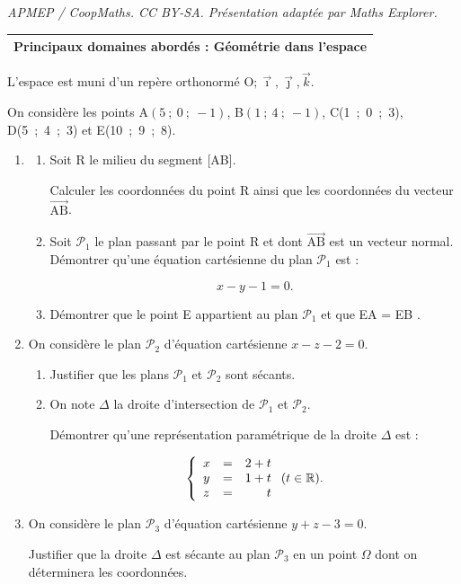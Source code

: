 \documentclass[10pt]{article}
\providecommand{\R}{\mathbb{R}}
\providecommand{\vect}[1]{\overrightarrow{#1}}
\providecommand{\Oijk}{\(\mathrm{O};\vec{\imath},\vec{\jmath},\vec{k}\)}
\begin{document}
\noindent\textit{APMEP / CoopMaths. CC BY-SA. Présentation adaptée par Maths Explorer.}\par\medskip
\medskip

\begin{tabularx}{\linewidth}{|X|}\hline
\textbf{Principaux domaines abordés :} Géométrie dans l'espace\\ \hline
\end{tabularx}

\medskip

L'espace est muni d'un repère orthonormé \Oijk.

On considère les points A$(5~;~0~;~-1)$, B$(1~;~4~;~-1)$, C(1~;~0~;~3), D(5~;~4~;~3) et E(10~;~9~;~8).

\medskip

\begin{enumerate}
\item 
	\begin{enumerate}
		\item Soit R le milieu du segment [AB].
		
Calculer les coordonnées du point R ainsi que les coordonnées du vecteur $\vect{\text{AB}}$.
		\item Soit $\mathcal{P}_1$ le plan passant par le point R et dont $\vect{\text{AB}}$ est un vecteur normal. Démontrer qu'une équation cartésienne du plan $\mathcal{P}_1$ est :

\[x - y - 1 = 0.\]

		\item Démontrer que le point E appartient au plan $\mathcal{P}_1$ et que EA = EB .
	\end{enumerate}	
\item  On considère le plan $\mathcal{P}_2$ d'équation cartésienne $x - z - 2 = 0$. 
	\begin{enumerate}
		\item Justifier que les plans $\mathcal{P}_1$ et $\mathcal{P}_2$ sont sécants.
		\item On note $\Delta$ la droite d'intersection de $\mathcal{P}_1$ et $\mathcal{P}_2$.
		
Démontrer qu'une représentation paramétrique de la droite $\Delta$ est :

\[\left\{\begin{array}{l c r}
x&=&2+t\\
y&=&1+t \\
z&=&t\end{array}\right.(t \in \R).\]

	\end{enumerate}
\item  On considère le plan $\mathcal{P}_3$ d'équation cartésienne $y + z - 3 = 0$.

Justifier que la droite $\Delta$ est sécante au plan $\mathcal{P}_3$ en un point $\Omega$ dont on déterminera les coordonnées.
\end{enumerate}
\end{document}

